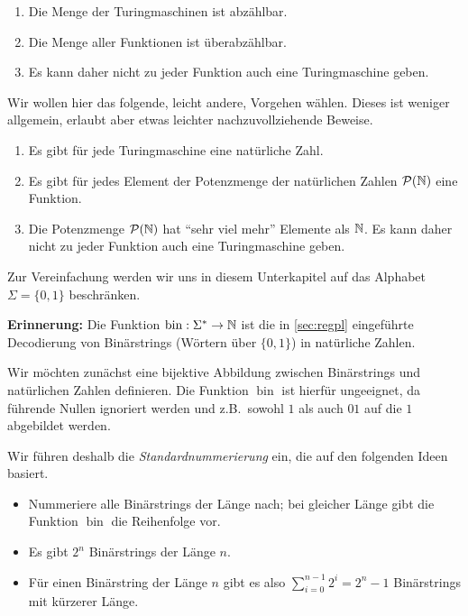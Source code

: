 \begin{enumerate}
 \item Die Menge der Turingmaschinen ist abzählbar.
 \item Die Menge aller Funktionen ist überabzählbar.
 \item Es kann daher nicht zu jeder Funktion auch eine Turingmaschine geben.
\end{enumerate}

Wir wollen hier das folgende, leicht andere, Vorgehen wählen.
Dieses ist weniger allgemein, erlaubt aber etwas leichter nachzuvollziehende Beweise.

\begin{enumerate}
 \item Es gibt für jede Turingmaschine eine natürliche Zahl.
 \item Es gibt für jedes Element der Potenzmenge der natürlichen Zahlen $\mathcal{P}(\mathbb{N})$ eine Funktion.
 \item Die Potenzmenge $\mathcal{P}(\mathbb{N})$ hat "`sehr viel mehr"' Elemente als $\mathbb{N}$.
 Es kann daher nicht zu jeder Funktion auch eine Turingmaschine geben.
\end{enumerate}





Zur Vereinfachung werden wir uns in diesem Unterkapitel auf das Alphabet $\Sigma=\{0,1\}$ beschränken.

\newcommand{\tmach}{\textit{TMACH}}
\newcommand{\bintonat}{\operatorname{bin}}
\newcommand{\stdnum}{\operatorname{stdnum}}
\newcommand{\nattotm}{\operatorname{nat2tm}}
\newcommand{\bintotm}{\operatorname{bin2tm}}
\newcommand{\langtopower}{\operatorname{lang2power}}
\newcommand{\functopower}{\operatorname{func2power}}

\textbf{Erinnerung: } Die Funktion $\bintonat:\Sigma^*\rightarrow\N$ 
ist die in \autoref{sec:regpl} eingeführte Decodierung von Binärstrings (Wörtern über $\{0,1\}$) in natürliche Zahlen.

Wir möchten zunächst eine bijektive Abbildung zwischen Binärstrings und natürlichen Zahlen definieren.
Die Funktion $\bintonat$ ist hierfür ungeeignet, da führende Nullen ignoriert werden und z.B.\ sowohl $1$ als auch $01$ auf die $1$ abgebildet werden.

Wir führen deshalb die \emph{Standardnummerierung} ein, die auf den folgenden Ideen basiert.
\begin{itemize}
 \item Nummeriere alle Binärstrings der Länge nach; bei gleicher Länge gibt die Funktion $\bintonat$ die Reihenfolge vor.
 \item Es gibt $2^n$ Binärstrings der Länge $n$.
 \item Für einen Binärstring der Länge $n$ gibt es also $\sum\limits_{i=0}^{n-1} 2^i = 2^n-1$ Binärstrings mit kürzerer Länge.
\end{itemize}


